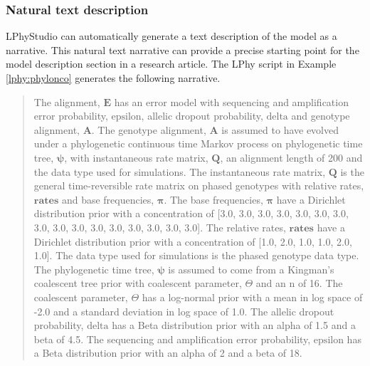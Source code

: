 \documentclass[10pt,letterpaper,table]{article}
\theoremstyle{definition}
\begin{document}
\subsubsection*{Natural text description}
\noindent LPhyStudio can automatically generate a text description of the model as a narrative. 
This natural text narrative can provide a precise starting point for the model description section in a research article.
The LPhy script in Example \ref{lphy:phylonco} generates the following narrative. 

\begin{quote} 
The alignment, $\boldsymbol{E}$ has an error model \cite{kozlov2022cellphy} with  sequencing and amplification error probability, $\textrm{epsilon}$,  allelic dropout probability, $\textrm{delta}$ and  genotype alignment, $\boldsymbol{A}$.
The genotype alignment, $\boldsymbol{A}$ is assumed to have evolved under a phylogenetic continuous time Markov process \cite{felsenstein1981} on  phylogenetic time tree, $\boldsymbol{\psi}$, with  instantaneous rate matrix, $\boldsymbol{Q}$, an alignment length of 200 and the data type used for simulations.
The instantaneous rate matrix, $\boldsymbol{Q}$ is the general time-reversible rate matrix on phased genotypes \cite{kozlov2022cellphy} with relative rates, $\boldsymbol{\textbf{rates}}$ and base frequencies, $\boldsymbol{\pi}$.
The base frequencies, $\boldsymbol{\pi}$ have a Dirichlet distribution prior with a concentration of [3.0, 3.0, 3.0, 3.0, 3.0, 3.0, 3.0, 3.0, 3.0, 3.0, 3.0, 3.0, 3.0, 3.0, 3.0, 3.0].
The relative rates, $\boldsymbol{\textbf{rates}}$ have a Dirichlet distribution prior with a concentration of [1.0, 2.0, 1.0, 1.0, 2.0, 1.0].
The data type used for simulations is the phased genotype data type.
The phylogenetic time tree, $\boldsymbol{\psi}$ is assumed to come from a Kingman's coalescent tree prior \cite{Rodrigo1999SerialCoalescent} with  coalescent parameter, $\Theta$ and an n of 16.
The coalescent parameter, $\Theta$ has a log-normal prior with a mean in log space of -2.0 and a standard deviation in log space of 1.0.
The allelic dropout probability, $\textrm{delta}$ has a Beta distribution prior with an alpha of 1.5 and a beta of 4.5.
The sequencing and amplification error probability, $\textrm{epsilon}$ has a Beta distribution prior with an alpha of 2 and a beta of 18.
\end{quote}
\end{document}
